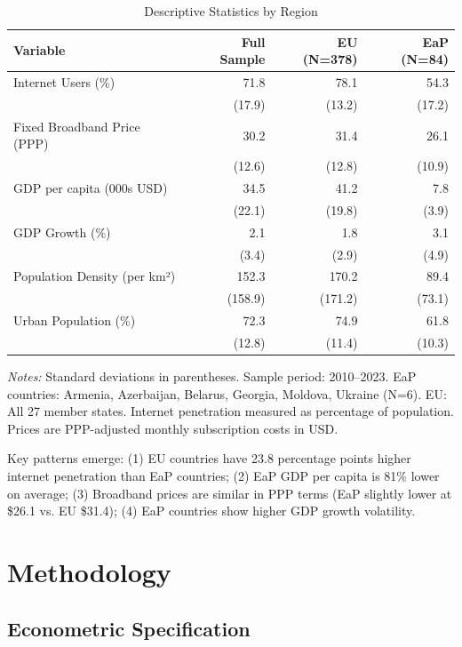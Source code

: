 \documentclass[12pt,review]{elsarticle}
\begin{document}
\begin{table}[htbp]
\centering
\caption{Descriptive Statistics by Region}
\label{tab:descriptive}
\begin{tabular}{lrrr}
\toprule
Variable & Full Sample & EU (N=378) & EaP (N=84) \\
\midrule
Internet Users (\%) & 71.8 & 78.1 & 54.3 \\
& (17.9) & (13.2) & (17.2) \\
Fixed Broadband Price (PPP) & 30.2 & 31.4 & 26.1 \\
& (12.6) & (12.8) & (10.9) \\
GDP per capita (000s USD) & 34.5 & 41.2 & 7.8 \\
& (22.1) & (19.8) & (3.9) \\
GDP Growth (\%) & 2.1 & 1.8 & 3.1 \\
& (3.4) & (2.9) & (4.9) \\
Population Density (per km²) & 152.3 & 170.2 & 89.4 \\
& (158.9) & (171.2) & (73.1) \\
Urban Population (\%) & 72.3 & 74.9 & 61.8 \\
& (12.8) & (11.4) & (10.3) \\
\bottomrule
\end{tabular}
\begin{tablenotes}
\small
\item \textit{Notes:} Standard deviations in parentheses. Sample period: 2010--2023. EaP countries: Armenia, Azerbaijan, Belarus, Georgia, Moldova, Ukraine (N=6). EU: All 27 member states. Internet penetration measured as percentage of population. Prices are PPP-adjusted monthly subscription costs in USD.
\end{tablenotes}
\end{table}

Key patterns emerge: (1) EU countries have 23.8 percentage points higher internet penetration than EaP countries; (2) EaP GDP per capita is 81\% lower on average; (3) Broadband prices are similar in PPP terms (EaP slightly lower at \$26.1 vs. EU \$31.4); (4) EaP countries show higher GDP growth volatility.

\section{Methodology}
\label{sec:methodology}

\subsection{Econometric Specification}
\end{document}
